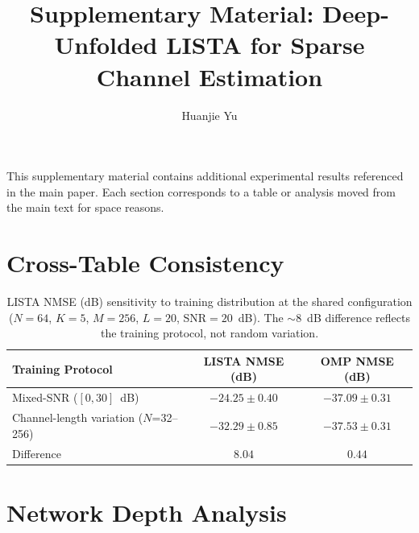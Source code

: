 \documentclass[a4paper,fleqn]{cas-sc}
\begin{document}
\let\WriteBookmarks\relax

\title [mode = title]{Supplementary Material: Deep-Unfolded LISTA for Sparse Channel Estimation}

\author[1]{Huanjie Yu}

\maketitle

This supplementary material contains additional experimental results referenced in the main paper. Each section corresponds to a table or analysis moved from the main text for space reasons.

\section{Cross-Table Consistency}\label{sec:supp_cross_table}

\begin{table}[width=.7\linewidth,cols=3,pos=h]
\caption{LISTA NMSE (dB) sensitivity to training distribution at the shared configuration ($N=64$, $K=5$, $M=256$, $L=20$, SNR$=20$~dB). The $\sim$8~dB difference reflects the training protocol, not random variation.}\label{tab:cross_table}
\begin{tabular*}{\tblwidth}{@{} LCC@{}}
\toprule
Training Protocol & LISTA NMSE (dB) & OMP NMSE (dB) \\
\midrule
Mixed-SNR ($[0, 30]$~dB)          & $-24.25 \pm 0.40$ & $-37.09 \pm 0.31$ \\
Channel-length variation ($N$=32--256) & $-32.29 \pm 0.85$ & $-37.53 \pm 0.31$ \\
\midrule
Difference & $\mathbf{8.04}$ & $0.44$ \\
\bottomrule
\end{tabular*}
\end{table}


\section{Network Depth Analysis}\label{sec:supp_convergence}
\end{document}
